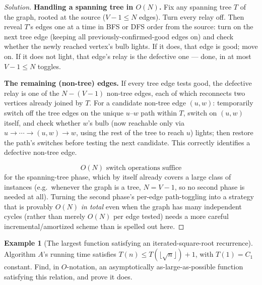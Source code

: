 \documentclass[11pt]{article}
\theoremstyle{definition}
\newtheorem{example}{Example}[section]
\begin{document}
\begin{proof}[Solution]
\textbf{Handling a spanning tree in $O(N)$.} Fix any spanning tree $T$ of the graph, rooted at the source ($V-1\le N$ edges). Turn every relay off. Then reveal $T$'s edges one at a time in BFS or DFS order from the source: turn on the next tree edge (keeping all previously-confirmed-good edges on) and check whether the newly reached vertex's bulb lights. If it does, that edge is good; move on. If it does not light, that edge's relay is the defective one — done, in at most $V-1\le N$ toggles.

\textbf{The remaining (non-tree) edges.} If every tree edge tests good, the defective relay is one of the $N-(V-1)$ non-tree edges, each of which reconnects two vertices already joined by $T$. For a candidate non-tree edge $(u,w)$: temporarily switch off the tree edges on the unique $u$–$w$ path within $T$, switch on $(u,w)$ itself, and check whether $w$'s bulb (now reachable only via $u\to\cdots\to(u,w)\to w$, using the rest of the tree to reach $u$) lights; then restore the path's switches before testing the next candidate. This correctly identifies a defective non-tree edge.

\[
\boxed{O(N)\text{ switch operations suffice}}
\]
for the spanning-tree phase, which by itself already covers a large class of instances (e.g.\ whenever the graph is a tree, $N=V-1$, so no second phase is needed at all). Turning the second phase's per-edge path-toggling into a strategy that is provably $O(N)$ \emph{in total} even when the graph has many independent cycles (rather than merely $O(N)$ per edge tested) needs a more careful incremental/amortized scheme than is spelled out here.
\end{proof}

\begin{example}[The largest function satisfying an iterated-square-root recurrence]
Algorithm $A$'s running time satisfies $T(n)\le T(\lfloor\sqrt n\rfloor)+1$, with $T(1)=C_1$ constant. Find, in $O$-notation, an asymptotically as-large-as-possible function satisfying this relation, and prove it does.
\end{example}
\end{document}

